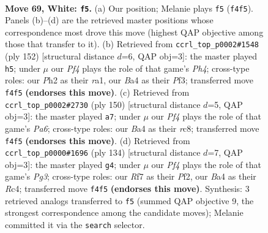 \documentclass[11pt]{article}
\begin{document}
\clearpage

\begin{figure}[p]\centering
\begin{subfigure}{0.46\textwidth}\centering
\resizebox{\linewidth}{!}{%
\newchessgame
\chessboard[
  setfen={8/5R2/k7/8/B4P2/4K3/7P/8 w - - 3 69},
  showmover=false,
  pgfstyle=straightmove, color=movearrow, markmove={f4-f5}
]}
\caption{}
\end{subfigure}\hfill
\begin{subfigure}{0.46\textwidth}\centering
\resizebox{\linewidth}{!}{%
\newchessgame
\chessboard[
  setfen={8/5k2/7R/8/7P/5PK1/8/r7 w - - 5 77},
  showmover=false,
  pgfstyle=straightmove, color=movearrow, markmove={h4-h5}
]}
\caption{}
\end{subfigure}
\\[4pt]
\begin{subfigure}{0.46\textwidth}\centering
\resizebox{\linewidth}{!}{%
\newchessgame
\chessboard[
  setfen={2r5/8/PK2p3/8/R7/3k4/8/8 w - - 5 76},
  showmover=false,
  pgfstyle=straightmove, color=movearrow, markmove={a6-a7}
]}
\caption{}
\end{subfigure}\hfill
\begin{subfigure}{0.46\textwidth}\centering
\resizebox{\linewidth}{!}{%
\newchessgame
\chessboard[
  setfen={4q3/1k6/8/8/2R5/6P1/5P1K/8 w - - 4 68},
  showmover=false,
  pgfstyle=straightmove, color=movearrow, markmove={g3-g4}
]}
\caption{}
\end{subfigure}
\caption{\textbf{Move 69, White: \texttt{f5}.} (a) Our position; Melanie plays \texttt{f5} (\texttt{f4f5}). Panels (b)--(d) are the retrieved master positions whose correspondence most drove this move (highest QAP objective among those that transfer to it). (b) Retrieved from \texttt{ccrl\_top\_p0002\#1548} (ply 152) [structural distance $d$=6, QAP obj=3]: the master played \texttt{h5}; under $\mu$ our \emph{Pf4} plays the role of that game's \emph{Ph4}; cross-type roles: our \emph{P}h2 as their \emph{r}a1, our \emph{B}a4 as their \emph{P}f3; transferred move \texttt{f4f5} \textbf{(endorses this move)}. (c) Retrieved from \texttt{ccrl\_top\_p0002\#2730} (ply 150) [structural distance $d$=5, QAP obj=3]: the master played \texttt{a7}; under $\mu$ our \emph{Pf4} plays the role of that game's \emph{Pa6}; cross-type roles: our \emph{B}a4 as their \emph{r}c8; transferred move \texttt{f4f5} \textbf{(endorses this move)}. (d) Retrieved from \texttt{ccrl\_top\_p0000\#1696} (ply 134) [structural distance $d$=7, QAP obj=3]: the master played \texttt{g4}; under $\mu$ our \emph{Pf4} plays the role of that game's \emph{Pg3}; cross-type roles: our \emph{R}f7 as their \emph{P}f2, our \emph{B}a4 as their \emph{R}c4; transferred move \texttt{f4f5} \textbf{(endorses this move)}. Synthesis: 3 retrieved analogs transferred to \texttt{f5} (summed QAP objective 9, the strongest correspondence among the candidate moves); Melanie committed it via the \texttt{search} selector.}
\label{fig:thought-m136}
\end{figure}
\end{document}
